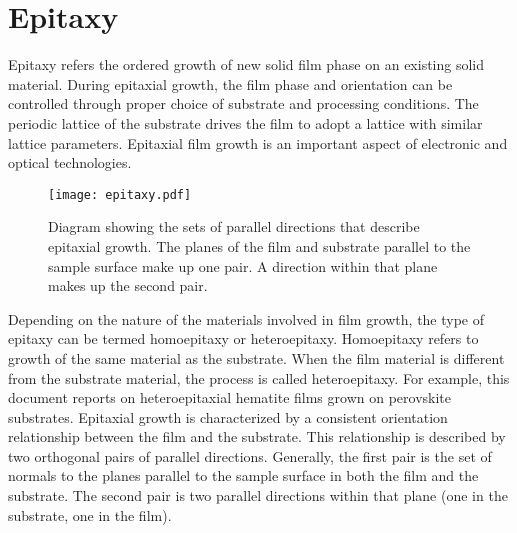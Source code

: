 \section{Epitaxy}
\label{sec:background.epitaxy}


Epitaxy refers the ordered growth of new solid film phase on an existing solid
material.\cite{Opel:2012ge,Herman:2004to,Hooks:2001vy} During epitaxial growth, the  film
phase and orientation can be controlled through proper choice of substrate and processing
conditions. The periodic lattice of the substrate drives the film to adopt a lattice with
similar lattice parameters. Epitaxial film growth is an important aspect of electronic and
optical technologies.

\begin{figure}
\begin{center}
\texttt{[image: epitaxy.pdf]}
\caption[Orientation relationships in epitaxy]{%
	Diagram showing the sets of parallel directions that describe epitaxial 
	growth. The planes of the film and substrate parallel to the sample surface
	make up one pair. A direction within that plane makes up the second pair. }
\label{fig:epitaxy}
\end{center}
\end{figure}
Depending on the nature of the materials involved in film growth, the type of epitaxy can
be termed homoepitaxy or heteroepitaxy. Homoepitaxy refers to growth of the same material
as the substrate. When the film material is different from the substrate material, the
process is called heteroepitaxy. For example, this document reports on heteroepitaxial
hematite films grown on perovskite substrates. Epitaxial growth is characterized by a
consistent orientation relationship between the film and the substrate. This relationship
is described by two orthogonal pairs of parallel directions. Generally, the first pair is
the set of normals to the planes parallel to the sample surface in both the film and the
substrate. The second pair is two parallel directions within that plane (one in the
substrate, one in the film). 

